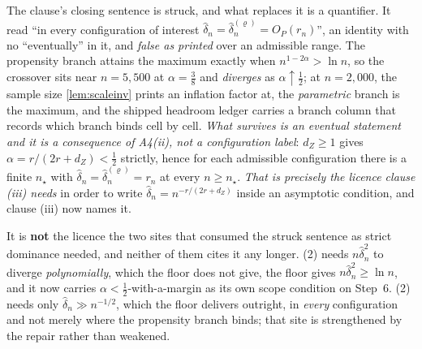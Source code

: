 \medskip
\noindent
 The clause's closing sentence is struck, and what replaces it is a quantifier. It read ``in every
configuration of interest $\hat\delta_n=\hat\delta_n^{(\varrho)}=O_P(r_n)$'', an identity with no
``eventually'' in it, and \emph{false as printed} over an admissible range. The propensity branch attains
the maximum exactly when $n^{1-2\alpha}>\ln n$, so the crossover sits near $n=5{,}500$ at
$\alpha=\tfrac38$ and \emph{diverges} as $\alpha\uparrow\tfrac12$; at $n=2{,}000$, the sample size
\cref{lem:scaleinv} prints an inflation factor at, the \emph{parametric} branch is the maximum, and the
shipped headroom ledger carries a branch column that records which branch binds cell by cell.
\emph{What survives is an eventual statement and it is a consequence of A4(ii), not a configuration
label}: $d_Z\ge1$ gives $\alpha=r/(2r+d_Z)<\tfrac12$ strictly, hence for each admissible configuration
there is a finite $n_\star$ with $\hat\delta_n=\hat\delta_n^{(\varrho)}=r_n$ at every $n\ge n_\star$.
\emph{That is precisely the licence clause \textup{(iii)} needs} in order to write
$\hat\delta_n=n^{-r/(2r+d_Z)}$ inside an asymptotic condition, and clause \textup{(iii)} now names it.

\medskip
\noindent
 It is \textbf{not} the licence the two sites that consumed the struck sentence as strict dominance
needed, and neither of them cites it any longer. \textup{(2)} needs
$n\hat\delta_n^{2}$ to diverge \emph{polynomially}, which the floor does not give, the floor gives
$n\hat\delta_n^{2}\ge\ln n$, and it now carries $\alpha<\tfrac12$-with-a-margin as its own scope
condition on Step~6. \textup{(2)} needs only $\hat\delta_n\gg n^{-1/2}$, which the
floor delivers outright, in \emph{every} configuration and not merely where the propensity branch binds;
that site is strengthened by the repair rather than weakened.

